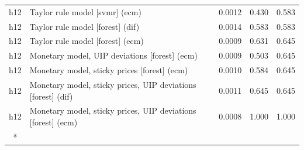 \begin{ThreePartTable}
\begin{longtable}[t]{cp{5.5cm}ccc}
h12 & \raggedright Taylor rule model [svmr] (ecm) & 0.0012 & 0.430 & 0.583\\
h12 & \raggedright Taylor rule model [forest] (dif) & 0.0014 & 0.583 & 0.583\\
h12 & \raggedright Taylor rule model [forest] (ecm) & 0.0009 & 0.631 & 0.645\\
h12 & \raggedright Monetary model, UIP deviations [forest] (ecm) & 0.0009 & 0.503 & 0.645\\
h12 & \raggedright Monetary model, sticky prices [forest] (ecm) & 0.0010 & 0.584 & 0.645\\
h12 & \raggedright Monetary model, sticky prices, UIP deviations [forest] (dif) & 0.0011 & 0.645 & 0.645\\
h12 & \raggedright Monetary model, sticky prices, UIP deviations [forest] (ecm) & 0.0008 & 1.000 & 1.000\\*
\end{longtable}
\end{ThreePartTable}
\endgroup{}
